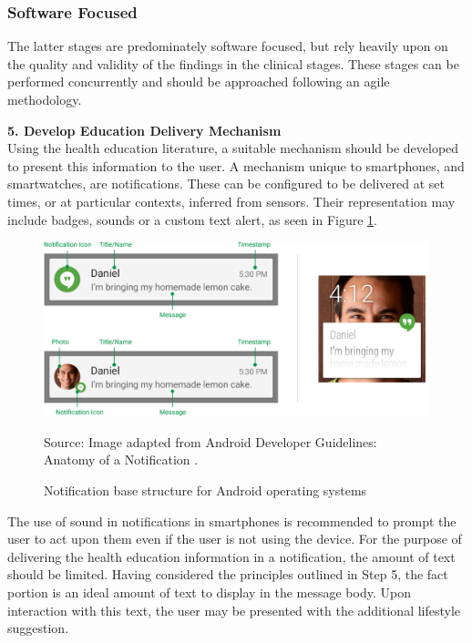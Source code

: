 \subsubsection{Software Focused}
The latter stages are predominately software focused, but rely heavily upon on the quality and validity of the findings in the clinical stages. These stages can be performed concurrently and should be approached following an agile methodology.

\textbf{5. Develop Education Delivery Mechanism}\\
Using the health education literature, a suitable mechanism should be developed to present this information to the user. A mechanism unique to smartphones, and smartwatches, are notifications. These can be configured to be delivered at set times, or at particular contexts, inferred from sensors. Their representation may include badges, sounds or a custom text alert, as seen in Figure \ref{fig: notification-android}.
\begin{figure}[h]
    \centering
    \includegraphics[scale=0.7, angle=0]{Files/prevention-study-1/figures/notification_android}
    \caption{Notification base structure for Android operating systems}
        \medskip
	\small
	Source: Image adapted from Android Developer Guidelines: Anatomy of a Notification \cite{NotificationsAndroid}.
    \label{fig: notification-android}
\end{figure}
The use of sound in notifications in smartphones is recommended to prompt the user to act upon them \cite{AppleNotifications2015} even if the user is not using the device. For the purpose of delivering the health education information in a notification, the amount of text should be limited. Having considered the principles outlined in Step 5, the fact portion is an ideal amount of text to display in the message body. Upon interaction with this text, the user may be presented with the additional lifestyle suggestion.

